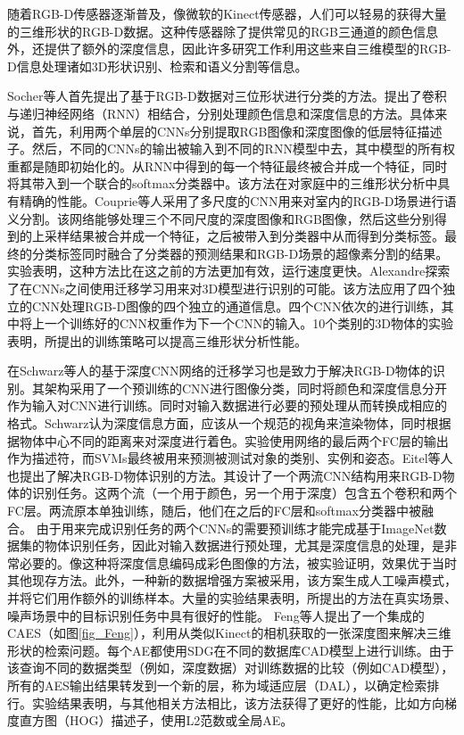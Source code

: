 随着RGB-D传感器逐渐普及，像微软的Kinect传感器，人们可以轻易的获得大量的三维形状的RGB-D数据。这种传感器除了提供常见的RGB三通道的颜色信息外，还提供了额外的深度信息，因此许多研究工作利用这些来自三维模型的RGB-D信息处理诸如3D形状识别、检索和语义分割等信息\cite{Sanchez2016A}。

Socher等人\cite{Socher2012Convolutional}首先提出了基于RGB-D数据对三位形状进行分类的方法。提出了卷积与递归神经网络（RNN）相结合，分别处理颜色信息和深度信息的方法。具体来说，首先，利用两个单层的CNNs分别提取RGB图像和深度图像的低层特征描述子。然后，不同的CNNs的输出被输入到不同的RNN模型中去，其中模型的所有权重都是随即初始化的。从RNN中得到的每一个特征最终被合并成一个特征，同时将其带入到一个联合的softmax分类器中。该方法在对家庭中的三维形状分析中具有精确的性能。Couprie等人\cite{Couprie2013Indoor}采用了多尺度的CNN用来对室内的RGB-D场景进行语义分割。该网络能够处理三个不同尺度的深度图像和RGB图像，然后这些分别得到的上采样结果被合并成一个特征，之后被带入到分类器中从而得到分类标签。最终的分类标签同时融合了分类器的预测结果和RGB-D场景的超像素分割的结果。实验表明，这种方法比在这之前的方法更加有效，运行速度更快。Alexandre\cite{Alexandre20123D}探索了在CNNs之间使用迁移学习用来对3D模型进行识别的可能。该方法应用了四个独立的CNN处理RGB-D图像的四个独立的通道信息。四个CNN依次的进行训练，其中将上一个训练好的CNN权重作为下一个CNN的输入。10个类别的3D物体的实验表明，所提出的训练策略可以提高三维形状分析性能。

在Schwarz等人\cite{Schwarz2015RGB}的基于深度CNN网络的迁移学习也是致力于解决RGB-D物体的识别。其架构采用了一个预训练的CNN进行图像分类，同时将颜色和深度信息分开作为输入对CNN进行训练。同时对输入数据进行必要的预处理从而转换成相应的格式。Schwarz认为深度信息方面，应该从一个规范的视角来渲染物体，同时根据据物体中心不同的距离来对深度进行着色。实验使用网络的最后两个FC层的输出作为描述符，而SVMs最终被用来预测被测试对象的类别、实例和姿态。Eitel等人\cite{Eitel2015Multimodal}也提出了解决RGB-D物体识别的方法。其设计了一个两流CNN结构用来RGB-D物体的识别任务。这两个流（一个用于颜色，另一个用于深度）包含五个卷积和两个FC层。两流原本单独训练，随后，他们在之后的FC层和softmax分类器中被融合。 由于用来完成识别任务的两个CNNs的需要预训练才能完成基于ImageNet数据集的物体识别任务，因此对输入数据进行预处理，尤其是深度信息的处理，是非常必要的。像这种将深度信息编码成彩色图像的方法，被实验证明，效果优于当时其他现存方法。此外，一种新的数据增强方案被采用，该方案生成人工噪声模式，并将它们用作额外的训练样本。大量的实验结果表明，所提出的方法在真实场景、噪声场景中的目标识别任务中具有很好的性能。 Feng等人\cite{Feng20163D}提出了一个集成的CAES（如图\ref{fig_Feng}），利用从类似Kinect的相机获取的一张深度图来解决三维形状的检索问题。每个AE都使用SDG在不同的数据库CAD模型上进行训练。由于该查询不同的数据类型（例如，深度数据）对训练数据的比较（例如CAD模型），所有的AES输出结果转发到一个新的层，称为域适应层（DAL），以确定检索排行。实验结果表明，与其他相关方法相比，该方法获得了更好的性能，比如方向梯度直方图（HOG）描述子，使用L2范数或全局AE。 

